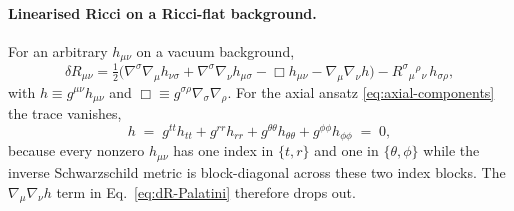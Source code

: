 \paragraph{Linearised Ricci on a Ricci-flat background.}
For an arbitrary $h_{\mu\nu}$ on a vacuum background,
\begin{equation}
  \delta R_{\mu\nu}
  = \tfrac{1}{2}\bigl(
        \nabla^{\sigma}\nabla_{\mu}h_{\nu\sigma}
      + \nabla^{\sigma}\nabla_{\nu}h_{\mu\sigma}
      - \Box h_{\mu\nu}
      - \nabla_{\mu}\nabla_{\nu} h
    \bigr)
  - R^{\sigma}{}_{\mu}{}^{\rho}{}_{\nu}\,h_{\sigma\rho},
\label{eq:dR-Palatini}
\end{equation}
with $h \equiv g^{\mu\nu}h_{\mu\nu}$ and
$\Box \equiv g^{\sigma\rho}\nabla_{\sigma}\nabla_{\rho}$.
For the axial ansatz \eqref{eq:axial-components} the trace
vanishes,
\begin{equation}
  h \;=\; g^{tt}h_{tt} + g^{rr}h_{rr}
        + g^{\theta\theta}h_{\theta\theta}
        + g^{\phi\phi}h_{\phi\phi}
        \;=\; 0,
\label{eq:axial-traceless}
\end{equation}
because every nonzero $h_{\mu\nu}$ has one index in $\{t,r\}$
and one in $\{\theta,\phi\}$ while the inverse Schwarzschild
metric is block-diagonal across these two index blocks. The
$\nabla_{\mu}\nabla_{\nu}h$ term in
Eq.~\eqref{eq:dR-Palatini} therefore drops out.

